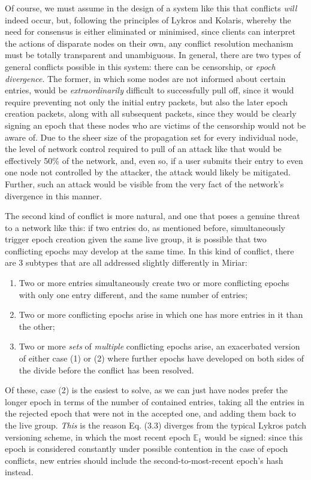 \documentclass{extreport}
\begin{document}
Of course, we must assume in the design of a system like this that conflicts \emph{will} indeed occur, but, following the principles of Lykros and Kolaris, whereby the need for consensus is either eliminated or minimised, since clients can interpret the actions of disparate nodes on their own, any conflict resolution mechanism must be totally transparent and unambiguous. In general, there are two types of general conflicts possible in this system: there can be censorship, or \emph{epoch divergence}. The former, in which some nodes are not informed about certain entries, would be \emph{extraordinarily} difficult to successfully pull off, since it would require preventing not only the initial entry packets, but also the later epoch creation packets, along with all subsequent packets, since they would be clearly signing an epoch that these nodes who are victims of the censorship would not be aware of. Due to the sheer size of the propagation set for every individual node, the level of network control required to pull of an attack like that would be effectively 50\% of the network, and, even so, if a user submits their entry to even one node not controlled by the attacker, the attack would likely be mitigated. Further, such an attack would be visible from the very fact of the network's divergence in this manner.

The second kind of conflict is more natural, and one that poses a genuine threat to a network like this: if two entries do, as mentioned before, simultaneously trigger epoch creation given the same live group, it is possible that two conflicting epochs may develop at the same time. In this kind of conflict, there are 3 subtypes that are all addressed slightly differently in Miriar:

\begin{enumerate}
\item Two or more entries simultaneously create two or more conflicting epochs with only one entry different, and the same number of entries;
\item Two or more conflicting epochs arise in which one has more entries in it than the other;
\item Two or more \emph{sets} of \emph{multiple} conflicting epochs arise, an exacerbated version of either case (1) or (2) where further epochs have developed on both sides of the divide before the conflict has been resolved.
\end{enumerate}

Of these, case (2) is the easiest to solve, as we can just have nodes prefer the longer epoch in terms of the number of contained entries, taking all the entries in the rejected epoch that were not in the accepted one, and adding them back to the live group. \emph{This} is the reason Eq. (3.3) diverges from the typical Lykros patch versioning scheme, in which the most recent epoch \(\mathbb{E}_1\) would be signed: since this epoch is considered constantly under possible contention in the case of epoch conflicts, new entries should include the second-to-most-recent epoch's hash instead.
\end{document}
